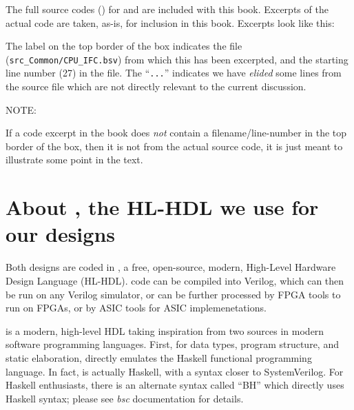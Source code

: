 The full source codes ({\BSV}) for {\DRUM} and {\FIFE} are included with this
book.  Excerpts of the actual code are taken, as-is, for inclusion in
this book.  Excerpts look like this:


The label on the top border of the box indicates the file
(\verb|src_Common/CPU_IFC.bsv|) from which this has been excerpted,
and the starting line number (27) in the file.  The ``\verb|...|''
indicates we have \emph{elided} some lines from the source file which
are not directly relevant to the current discussion.

\vspace{1ex}

NOTE: 

\vspace{1ex}

If a code excerpt in the book does \emph{not} contain a
filename/line-number in the top border of the box, then it is not from
the actual source code, it is just meant to illustrate some point in
the text.


\section{About {\BSV}, the HL-HDL we use for our designs}

Both designs are coded in {\BSV}, a free, open-source, modern, High-Level
Hardware Design Language (HL-HDL).  {\BSV} code can be compiled into
Verilog, which can then be run on any Verilog simulator, or can be
further processed by FPGA tools to run on FPGAs, or by ASIC tools for
ASIC implemenetations.


{\BSV} is a modern, high-level HDL taking inspiration from two sources in
modern software programming languages.  First, for data types, program
structure, and static elaboration, {\BSV} directly emulates the Haskell
functional programming language.  In fact, {\BSV} is actually Haskell,
with a syntax closer to SystemVerilog.  For Haskell enthusiasts, there
is an alternate syntax called ``BH'' which directly uses Haskell
syntax; please see \emph{bsc} documentation for details.

